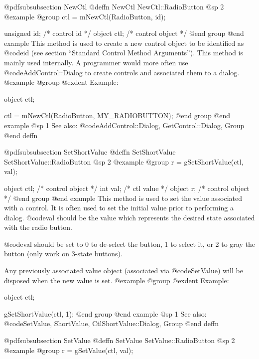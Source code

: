 @pdfsubsubsection {NewCtl}
@deffn {NewCtl} NewCtl::RadioButton
@sp 2
@example
@group
ctl = mNewCtl(RadioButton, id);

unsigned  id;   /*  control id      */
object   ctl;   /*  control object  */
@end group
@end example
This method is used to create a new control object to be identified as
@code{id} (see section ``Standard Control Method Arguments'').  This
method is mainly used internally.  A programmer would more often
use @code{AddControl::Dialog} to create controls and associated them
to a dialog.
@example
@group
@exdent Example:

object  ctl;

ctl = mNewCtl(RadioButton, MY_RADIOBUTTON);
@end group
@end example
@sp 1
See also:  @code{AddControl::Dialog, GetControl::Dialog, Group}
@end deffn







@pdfsubsubsection {SetShortValue}
@deffn {SetShortValue} SetShortValue::RadioButton
@sp 2
@example
@group
r = gSetShortValue(ctl, val);

object  ctl;    /*  control object  */
int     val;    /*  ctl value       */
object  r;      /*  control object  */
@end group
@end example
This method is used to set the value associated with a control.  It is
often used to set the initial value prior to performing a dialog.
@code{val} should be the value which represents the desired state associated
with the radio button.

@code{val} should be set to 0 to de-select the button, 1 to select it, or 2 to
gray the button (only work on 3-state buttons).

Any previously associated value object (associated via @code{SetValue})
will be disposed when the new value is set.
@example
@group
@exdent Example:

object  ctl;

gSetShortValue(ctl, 1);
@end group
@end example
@sp 1
See also:  @code{SetValue, ShortValue, CtlShortValue::Dialog, Group}
@end deffn
















@pdfsubsubsection {SetValue}
@deffn {SetValue} SetValue::RadioButton
@sp 2
@example
@group
r = gSetValue(ctl, val);

